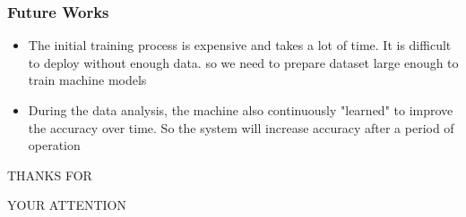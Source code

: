 \documentclass{beamer}
\begin{document}
\begin{frame}
\frametitle{Future Works} %
\begin{itemize}
\item The initial training process is expensive and takes a lot of time. It is difficult to deploy without enough data. so we need to prepare dataset large enough to train machine models
\item During the data analysis, the machine also continuously "learned" to improve the accuracy over time. So the system will increase accuracy after a period of operation
\end{itemize}
\end{frame}


\begin{frame}
\Huge{\centerline{THANKS FOR}}
\Huge{\centerline{YOUR ATTENTION}}
\end{frame}

\end{document}
